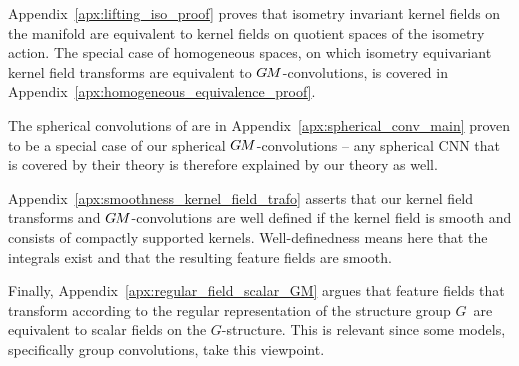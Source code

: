 Appendix~\ref{apx:lifting_iso_proof} proves that isometry invariant kernel fields on the manifold are equivalent to kernel fields on quotient spaces of the isometry action.
The special case of homogeneous spaces, on which isometry equivariant kernel field transforms are equivalent to $G\mkern-1.4muM$-convolutions, is covered in Appendix~\ref{apx:homogeneous_equivalence_proof}.

The spherical convolutions of \citet{Cohen2019-generaltheory} are in Appendix~\ref{apx:spherical_conv_main} proven to be a special case of our spherical $G\mkern-1.4muM$-convolutions
-- any spherical CNN that is covered by their theory is therefore explained by our theory as well.

Appendix~\ref{apx:smoothness_kernel_field_trafo} asserts that our kernel field transforms and $G\mkern-1.4muM$-convolutions are well defined if the kernel field is smooth and consists of compactly supported kernels.
Well-definedness means here that the integrals exist and that the resulting feature fields are smooth.

Finally, Appendix~\ref{apx:regular_field_scalar_GM} argues that feature fields that transform according to the regular representation of the structure group $G$~are equivalent to scalar fields on the $G$-structure.
This is relevant since some models, specifically group convolutions, take this viewpoint.
